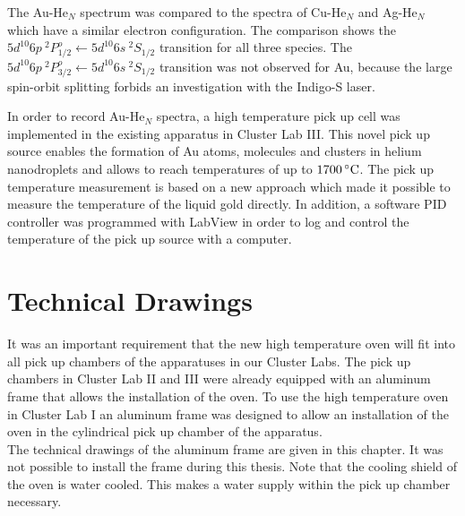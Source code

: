 \documentclass[parskip,12pt,headsepline,a4paper] {scrbook}
\begin{document}
The Au-He$_N$ spectrum was compared to the spectra of Cu-He$_N$ and Ag-He$_N$ which have a similar electron configuration. The comparison shows the $5d^{10}6p \ ^2P^o_{1/2} \leftarrow 5d^{10}6s \ ^2S_{1/2}$ transition for all three species. The $5d^{10}6p \ ^2P^o_{3/2} \leftarrow 5d^{10}6s \ ^2S_{1/2}$ transition was not observed for Au, because the large spin-orbit splitting forbids an investigation with the Indigo-S laser.

In order to record Au-He$_N$ spectra, a high temperature pick up cell was implemented in the existing apparatus in Cluster Lab III. This novel pick up source enables the formation of Au atoms, molecules and clusters in helium nanodroplets and allows to reach temperatures of up to $\unit[1700]{^\circ C}$. The pick up temperature measurement is based on a new approach which made it possible to measure the temperature of the liquid gold directly. In addition, a software PID controller was programmed with LabView in order to log and control the temperature of the pick up source with a computer.



\appendix
\chapter{Technical Drawings}
\label{chap:techdraw}
It was an important requirement that the new high temperature oven will fit into all pick up chambers of the apparatuses in our Cluster Labs. The pick up chambers in Cluster Lab II and III were already equipped with an aluminum frame that allows the installation of the oven. To use the high temperature oven in Cluster Lab I an aluminum frame was designed to allow an installation of the oven in the cylindrical pick up chamber of the apparatus. \\
The technical drawings of the aluminum frame are given in this chapter. It was not possible to install the frame during this thesis. Note that the cooling shield of the oven is water cooled. This makes a water supply within the pick up chamber necessary.
\end{document}

